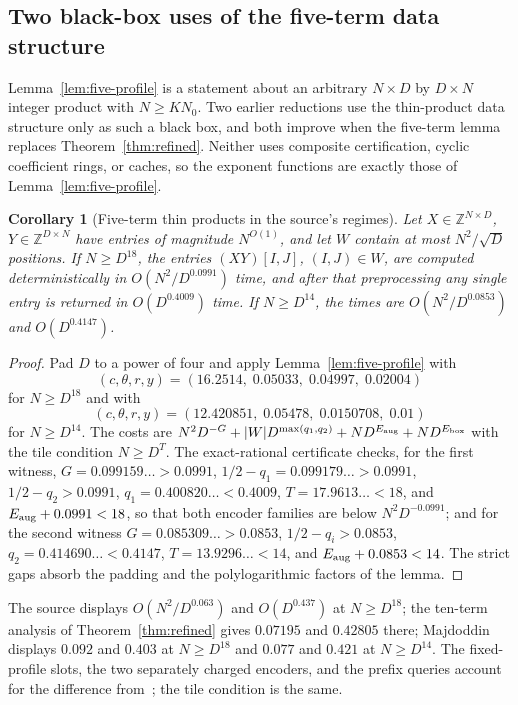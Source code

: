 \documentclass[11pt]{article}
\newtheorem{corollary}[theorem]{Corollary}
\begin{document}
\subsection*{Two black-box uses of the five-term data structure}
Lemma~\ref{lem:five-profile} is a statement about an arbitrary
$N\times D$ by $D\times N$ integer product with $N\ge KN_0$. Two earlier
reductions use the thin-product data structure only as such a black box,
and both improve when the five-term lemma replaces
Theorem~\ref{thm:refined}. Neither uses composite certification, cyclic
coefficient rings, or caches, so the exponent functions are exactly those
of Lemma~\ref{lem:five-profile}.

\begin{corollary}[Five-term thin products in the source's regimes]
\label{cor:five-thin}
Let $X\in\mathbb Z^{N\times D}$, $Y\in\mathbb Z^{D\times N}$ have entries
of magnitude $N^{O(1)}$, and let $W$ contain at most $N^2/\sqrt D$
positions. If $N\ge D^{18}$, the entries $(XY)[I,J]$, $(I,J)\in W$, are
computed deterministically in $O(N^2/D^{0.0991})$ time, and after that
preprocessing any single entry is returned in $O(D^{0.4009})$ time. If
$N\ge D^{14}$, the times are $O(N^2/D^{0.0853})$ and $O(D^{0.4147})$.
\end{corollary}
\begin{proof}
Pad $D$ to a power of four and apply Lemma~\ref{lem:five-profile} with
\[
(c,\theta,r,y)=(16.2514,\;0.05033,\;0.04997,\;0.02004)
\]
for $N\ge D^{18}$ and with
\[
(c,\theta,r,y)=(12.420851,\;0.05478,\;0.0150708,\;0.01)
\]
for $N\ge D^{14}$. The costs are $N^2D^{-G}+|W|D^{\max(q_1,q_2)}
+ND^{E_{\rm aug}}+ND^{E_{\rm box}}$ with the tile condition $N\ge D^T$.
The exact-rational certificate checks, for the first witness,
$G=0.099159\ldots>0.0991$, $1/2-q_1=0.099179\ldots>0.0991$,
$1/2-q_2>0.0991$, $q_1=0.400820\ldots<0.4009$, $T=17.9613\ldots<18$,
and $E_{\rm aug}+0.0991<18$, so that both encoder families are below
$N^2D^{-0.0991}$; and for the second witness $G=0.085309\ldots>0.0853$,
$1/2-q_i>0.0853$, $q_2=0.414690\ldots<0.4147$, $T=13.9296\ldots<14$, and
$E_{\rm aug}+0.0853<14$. The strict gaps absorb the padding and the
polylogarithmic factors of the lemma.
\end{proof}
The source displays $O(N^2/D^{0.063})$ and $O(D^{0.437})$ at $N\ge D^{18}$;
the ten-term analysis of Theorem~\ref{thm:refined} gives $0.07195$ and
$0.42805$ there; Majdoddin~\cite{M26} displays $0.092$ and $0.403$ at
$N\ge D^{18}$ and $0.077$ and $0.421$ at $N\ge D^{14}$. The fixed-profile
slots, the two separately charged encoders, and the prefix queries account
for the difference from~\cite{M26}; the tile condition is the same.
\end{document}
